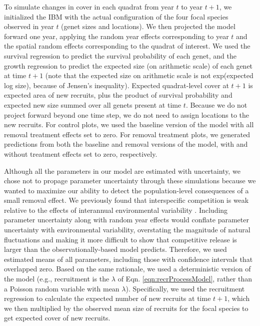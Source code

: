 \documentclass[11pt]{article}
\begin{document}
\begin{doublespacing}
To simulate changes in cover in each quadrat from year $t$ to year $t+1$, we initialized the IBM with the actual 
configuration of the four focal species observed in year $t$ (genet sizes and locations). 
We then projected the model forward one year, applying the random year effects corresponding to year $t$ and the spatial random effects corresponding to the quadrat of interest. 
We used the survival regression to predict the survival probability of each genet, and the growth regression to predict the expected size (on arithmetic scale) of each genet at time $t+1$ (note that the expected size on arithmetic scale is not exp(expected log size), because of Jensen's inequality). 
Expected quadrat-level cover at $t+1$ is expected area of new recruits, plus the product of survival probability and expected new size summed over all genets present at time $t$. 
Because we do not project forward beyond one time step, we do not need to assign locations to the new recruits. For control plots, we used the baseline version of the model with all 
removal treatment effects set to zero. For removal treatment plots, we generated predictions from both the baseline and removal versions of the model, 
with and without treatment effects set to zero, respectively.  

Although all the parameters in our model are estimated with uncertainty, we chose not to propage parameter uncertainty through these 
simulations because we wanted to maximize our ability to detect the population-level consequences of a small removal effect. 
We previously found that interspecific competition is weak relative to the effects of interannual environmental variability 
\citep{Tredennick2017}. Including parameter uncertainty along with random year effects would conflate parameter uncertainty 
with environmental variability, overstating the magnitude of natural fluctuations and making it more difficult to show that competitive release
is larger than the observationally-based model predicts. Therefore, we used estimated means of all parameters, including those with 
confidence intervals that overlapped zero. Based on the same rationale, we used a deterministic version of the model (e.g., 
recruitment is the $\lambda$ of Eqn. \ref{eqn:recrProcessModel}, rather than a Poisson random variable with mean $\lambda$). 
Specifically, we used the recruitment regression to calculate the expected number of new recruits at time $t+1$, which we then multiplied 
by the observed mean size of recruits for the focal species to get expected cover of new recruits. 


\end{doublespacing}
\end{document}
